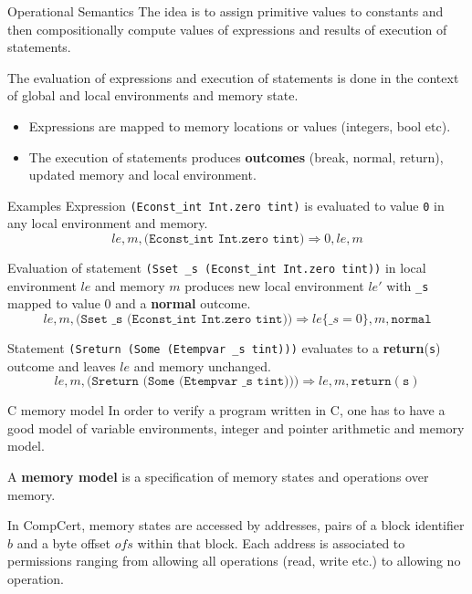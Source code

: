 \documentclass[10pt]{beamer}
\begin{document}
  \begin{frame}[fragile]{Operational Semantics}
    The idea is to assign primitive values to constants and then compositionally compute values of expressions and results of execution of statements. 
    
    The evaluation of expressions and execution of statements is done in the context of global and local environments and memory state.
   \begin{itemize}
    
    \item Expressions are mapped to memory locations or values (integers, bool etc).
    \item The execution of statements produces {\bf outcomes} (break, normal, return), updated memory and local environment. 
   \end{itemize}

\end{frame}

\begin{frame}{Examples}
     Expression  \texttt{(Econst\_int Int.zero tint)}   is evaluated to value \texttt{0} in any local environment and memory. 
      \[ le, m , \texttt{(Econst\_int Int.zero tint)} \Rightarrow 0, le, m \]

   Evaluation of statement \texttt{(Sset \_s (Econst\_int Int.zero tint))} in local environment $le$ and memory $m$ produces new local environment $le'$ with \texttt{\_s} mapped to value $0$ and a {\bf normal} outcome. 
   \[ le, m, \texttt{(Sset \_s (Econst\_int Int.zero tint))} \Rightarrow le\{\_s = 0\}, m, \texttt{normal} \]

   Statement \texttt{(Sreturn (Some (Etempvar \_s tint)))} evaluates to a {\bf return}(\texttt{s}) outcome and leaves $le$ and memory unchanged.
     \[ le, m,\texttt{(Sreturn (Some (Etempvar \_s tint)))}  \Rightarrow le, m, \texttt{return}(\texttt{s}) \]
    

\end{frame}
   
\begin{frame}[fragile]{C memory model}
   In order to verify a program written in C, one has to have a good model of variable environments, integer and pointer arithmetic and memory model. 
   
    A {\bf memory model} is a specification of memory states and operations over memory.
    
    In CompCert,
   memory states are accessed by addresses, pairs of a block
  identifier $b$ and a byte offset $ofs$ within that block.
  Each address is associated to permissions ranging from allowing all operations (read, write etc.) to allowing no operation.
\end{frame}
\end{document}
